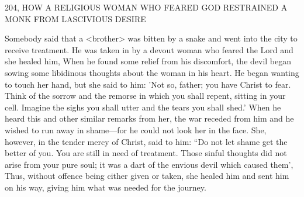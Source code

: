 204, HOW A RELIGIOUS WOMAN
WHO FEARED GOD RESTRAINED A MONK
FROM LASCIVIOUS DESIRE

Somebody said that a <brother> was bitten by a snake and went
into the city to receive treatment. He was taken in by a devout
woman who feared the Lord and she healed him, When he found
some relief from his discomfort, the devil began sowing some
libidinous thoughts about the woman in his heart. He began
wanting to touch her hand, but she said to him: 'Not so, father; you
have Christ to fear. Think of the sorrow and the remorse in which
you shall repent, sitting in your cell. Imagine the sighs you shall
utter and the tears you shall shed.' When he heard this and other
similar remarks from her, the war receded from him and he wished
to run away in shame—for he could not look her in the face. She,
however, in the tender mercy of Christ, said to him: “Do not let
shame get the better of you. You are still in need of treatment.
Those sinful thoughts did not arise from your pure soul; it was a
dart of the envious devil which caused them', Thus, without offence
being cither given or taken, she healed him and sent him on his
way, giving him what was needed for the journey.

